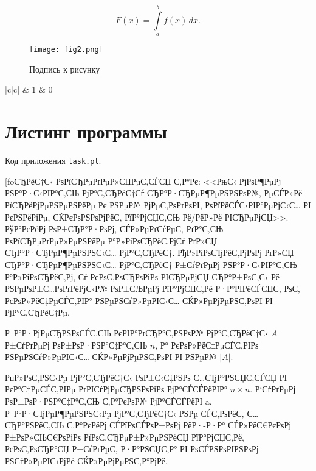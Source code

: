 \documentclass[bachelor, och, pract]{SCWorks}
\begin{document}
\begin{equation}
  F(x)=\int\limits_a^bf(x)\,dx.
\end{equation}


\begin{figure}[!ht]
	\centering
	\texttt{[image: fig2.png]}
	\caption{\label{fig:f3}%
	Подпись к рисунку}
\end{figure}


\begin{table}[!ht]
\caption{}
\begin{tabular}{|c|c|}
   & 1\cr
   & 0\cr
  \hline
\end{tabular}
\end{table}


\section{Листинг программы}\label{pril-1}
Код приложения \verb"task.pl".

\VerbatimInput[foСЂРёС†С‹ РѕРїСЂРµРґРµР»СЏРµС‚СЃСЏ С‚Р°Рє: <<РњС‹ РјРѕР¶РµРј РЅР°Р·С‹РІР°С‚СЊ РјР°С‚СЂРёС†Сѓ СЂР°Р·СЂРµР¶РµРЅРЅРѕР№, РµСЃР»Рё РїСЂРёРјРµРЅРµРЅРёРµ Рє РЅРµР№ РјРµС‚РѕРґРѕРІ, РѕРїРёСЃС‹РІР°РµРјС‹С… РІ РєРЅРёРіРµ, СЌРєРѕРЅРѕРјРёС‚ РїР°РјСЏС‚СЊ Рё/РёР»Рё РІСЂРµРјСЏ>>. РўР°РєРёРј РѕР±СЂР°Р·РѕРј, СЃР»РµРґСѓРµС‚ РґР°С‚СЊ РѕРїСЂРµРґРµР»РµРЅРёРµ Р°Р»РіРѕСЂРёС‚РјСѓ РґР»СЏ СЂР°Р·СЂРµР¶РµРЅРЅС‹С… РјР°С‚СЂРёС†. РђР»РіРѕСЂРёС‚РјРѕРј РґР»СЏ СЂР°Р·СЂРµР¶РµРЅРЅС‹С… РјР°С‚СЂРёС† Р±СѓРґРµРј РЅР°Р·С‹РІР°С‚СЊ Р°Р»РіРѕСЂРёС‚Рј, Сѓ РєРѕС‚РѕСЂРѕРіРѕ РІСЂРµРјСЏ СЂР°Р±РѕС‚С‹ Рё РЅРµРѕР±С…РѕРґРёРјС‹Р№ РѕР±СЉРµРј РїР°РјСЏС‚Рё Р·Р°РІРёСЃСЏС‚ РѕС‚ РєРѕР»РёС‡РµСЃС‚РІР° РЅРµРЅСѓР»РµРІС‹С… СЌР»РµРјРµРЅС‚РѕРІ РІ РјР°С‚СЂРёС†Рµ.

Р Р°Р·РјРµСЂРЅРѕСЃС‚СЊ РєРІР°РґСЂР°С‚РЅРѕР№ РјР°С‚СЂРёС†С‹ $A$ Р±СѓРґРµРј РѕР±РѕР·РЅР°С‡Р°С‚СЊ $n$, Р° РєРѕР»РёС‡РµСЃС‚РІРѕ РЅРµРЅСѓР»РµРІС‹С… СЌР»РµРјРµРЅС‚РѕРІ РІ РЅРµР№ $|A|$.

РџР»РѕС‚РЅС‹Рµ РјР°С‚СЂРёС†С‹ РѕР±С‹С‡РЅРѕ С…СЂР°РЅСЏС‚СЃСЏ РІ РєР°С‡РµСЃС‚РІРµ РґРІСѓРјРµСЂРЅРѕРіРѕ РјР°СЃСЃРёРІР° $n\times n$. Р‘СѓРґРµРј РѕР±РѕР·РЅР°С‡Р°С‚СЊ С‚Р°РєРѕР№ РјР°СЃСЃРёРІ a. Р Р°Р·СЂРµР¶РµРЅРЅС‹Рµ РјР°С‚СЂРёС†С‹ РЅРµ СЃС‚РѕРёС‚ С…СЂР°РЅРёС‚СЊ С‚Р°РєРёРј СЃРїРѕСЃРѕР±РѕРј РёР·-Р·Р° СЃР»РёС€РєРѕРј Р±РѕР»СЊС€РѕРіРѕ РїРѕС‚СЂРµР±Р»РµРЅРёСЏ РїР°РјСЏС‚Рё, РєРѕС‚РѕСЂР°СЏ Р±СѓРґРµС‚ Р·Р°РЅСЏС‚Р° РІ РѕСЃРЅРѕРІРЅРѕРј РЅСѓР»РµРІС‹РјРё СЌР»РµРјРµРЅС‚Р°РјРё.
\end{document}
